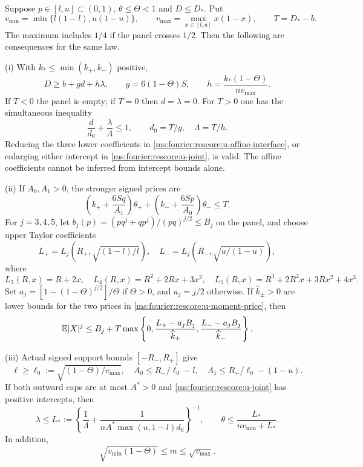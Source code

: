 \begin{lemma}\label{ms:fourier:rescore:u-three-uses}
Suppose $p\in[l,u]\subset(0,1)$, $\theta\le\Theta<1$ and
$D\le D_*$.  Put
\[
 v_{\min}=\min\{l(1-l),u(1-u)\},\qquad
 v_{\max}=\max_{x\in[l,u]}x(1-x),\qquad T=D_*-b.
\]
The maximum includes $1/4$ if the panel crosses $1/2$.
Then the following are consequences for the same law.

\textup{(i)} With $k_*\le\min(k_+,k_-)$ positive,
\begin{equation}\label{ms:fourier:rescore:u-affine-interface}
 D\ge b+g d+h\lambda,\qquad
 g=6(1-\Theta)S,\qquad h=\frac{k_*(1-\Theta)}{n v_{\max}}.
\end{equation}
If $T<0$ the panel is empty; if $T=0$ then $d=\lambda=0$.
For $T>0$ one has the simultaneous inequality
\begin{equation}\label{ms:fourier:rescore:u-joint}
 \frac d{d_0}+\frac\lambda\Lambda\le1,
 \qquad d_0=T/g,\quad\Lambda=T/h.
\end{equation}
Reducing the three lower coefficients in \eqref{ms:fourier:rescore:u-affine-interface},
or enlarging either intercept in \eqref{ms:fourier:rescore:u-joint}, is valid.
The affine coefficients cannot be inferred from intercept bounds alone.

\textup{(ii)} If $A_0,A_1>0$, the stronger signed prices are
\begin{equation}\label{ms:fourier:rescore:u-moment-price}
 \left(k_++\frac{6Sq}{A_1}\right)\theta_+
 +\left(k_-+\frac{6Sp}{A_0}\right)\theta_-\le T.
\end{equation}
For $j=3,4,5$, let $b_j(p)=(pq^j+qp^j)/(pq)^{j/2}\le B_j$ on
the panel, and choose upper Taylor coefficients
\[
 L_+=L_j(R_+,\sqrt{(1-l)/l}),\quad
 L_-=L_j(R_-,\sqrt{u/(1-u)}),
\]
where
\[
 L_3(R,x)=R+2x,\quad L_4(R,x)=R^2+2Rx+3x^2,
 \quad L_5(R,x)=R^3+2R^2x+3Rx^2+4x^3.
\]
Set $a_j=[1-(1-\Theta)^{j/2}]/\Theta$ if $\Theta>0$, and
$a_j=j/2$ otherwise.  If $\widehat k_\pm>0$ are lower bounds
for the two prices in \eqref{ms:fourier:rescore:u-moment-price}, then
\begin{equation}\label{ms:fourier:rescore:u-moment-bound}
 \mathbb E|X|^j\le B_j+T\max\left\{0,
 \frac{L_+-a_jB_j}{\widehat k_+},
 \frac{L_--a_jB_j}{\widehat k_-}\right\}.
\end{equation}

\textup{(iii)} Actual signed support bounds $[-R_-,R_+]$ give
\begin{equation}\label{ms:fourier:rescore:u-amplitudes}
 \ell\ge\ell_0:=\sqrt{(1-\Theta)/v_{\max}},\quad
 A_0\le R_-/\ell_0-l,\quad A_1\le R_+/\ell_0-(1-u).
\end{equation}
If both outward caps are at most $A^*>0$ and \eqref{ms:fourier:rescore:u-joint} has
positive intercepts, then
\begin{equation}\label{ms:fourier:rescore:u-harmonic}
 \lambda\le L_*:=\left\{\frac1\Lambda+
          \frac1{nA^*\max(u,1-l)d_0}\right\}^{-1},\qquad
 \theta\le\frac{L_*}{n v_{\min}+L_*}.
\end{equation}
In addition,
\begin{equation}\label{ms:fourier:rescore:u-mean}
 \sqrt{v_{\min}(1-\Theta)}\le m\le\sqrt{v_{\max}}.
\end{equation}
\end{lemma}
